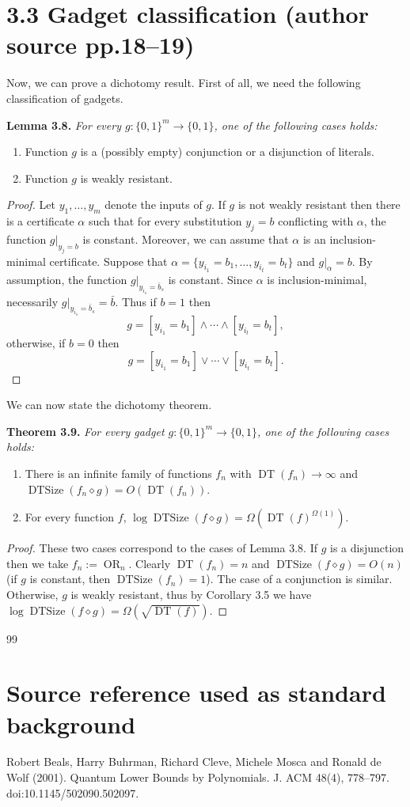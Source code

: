 \documentclass[10pt,a4paper]{article}
\newcommand{\bits}{\{0,1\}}
\newcommand{\DT}{\operatorname{DT}}
\newcommand{\DTSize}{\operatorname{DTSize}}
\newcommand{\comp}{\diamond}
\newcommand{\OR}{\operatorname{OR}}
\newenvironment{originalresult}[1]{\par\medskip\noindent\textbf{#1.}\itshape}{\par\medskip}
\begin{document}
\section*{3.3 Gadget classification (author source pp.18--19)}
Now, we can prove a dichotomy result. First of all, we need the following classification of gadgets.
\begin{originalresult}{Lemma 3.8}
For every $g:\bits^m\to\bits$, one of the following cases holds:
\begin{enumerate}
\item[(i)] Function $g$ is a (possibly empty) conjunction or a disjunction of literals.
\item[(ii)] Function $g$ is weakly resistant.
\end{enumerate}
\end{originalresult}
\begin{proof}
Let $y_1,\ldots,y_m$ denote the inputs of $g$. If $g$ is not weakly resistant then there is a certificate $\alpha$ such that for every substitution $y_j=b$ conflicting with $\alpha$, the function $g|_{y_j=b}$ is constant. Moreover, we can assume that $\alpha$ is an inclusion-minimal certificate.
Suppose that $\alpha=\{y_{i_1}=b_1,\ldots,y_{i_t}=b_t\}$ and $g|_\alpha=b$. By assumption, the function $g|_{y_{i_s}=\bar b_s}$ is constant. Since $\alpha$ is inclusion-minimal, necessarily $g|_{y_{i_s}=\bar b_s}=\bar b$. Thus if $b=1$ then
\[g=[y_{i_1}=b_1]\wedge\cdots\wedge[y_{i_t}=b_t],\]
otherwise, if $b=0$ then
\[g=[y_{i_1}=b_1]\vee\cdots\vee[y_{i_t}=b_t].\]
\end{proof}
We can now state the dichotomy theorem.

\begin{originalresult}{Theorem 3.9}
For every gadget $g:\bits^m\to\bits$, one of the following cases holds:
\begin{enumerate}
\item[(i)] There is an infinite family of functions $f_n$ with $\DT(f_n)\to\infty$ and $\DTSize(f_n\comp g)=O(\DT(f_n))$.
\item[(ii)] For every function $f$, $\log\DTSize(f\comp g)=\Omega(\DT(f)^{\Omega(1)})$.
\end{enumerate}
\end{originalresult}

\begin{proof}
These two cases correspond to the cases of Lemma 3.8. If $g$ is a disjunction then we take $f_n:=\OR_n$. Clearly $\DT(f_n)=n$ and $\DTSize(f\comp g)=O(n)$ (if $g$ is constant, then $\DTSize(f_n)=1$). The case of a conjunction is similar.
Otherwise, $g$ is weakly resistant, thus by Corollary 3.5 we have $\log\DTSize(f\comp g)=\Omega(\sqrt{\DT(f)})$.
\end{proof}

\begin{thebibliography}{99}
\section*{Source reference used as standard background}
Robert Beals, Harry Buhrman, Richard Cleve, Michele Mosca and Ronald de Wolf (2001). Quantum Lower Bounds by Polynomials. J. ACM 48(4), 778--797. doi:10.1145/502090.502097.
\end{thebibliography}
\end{document}
